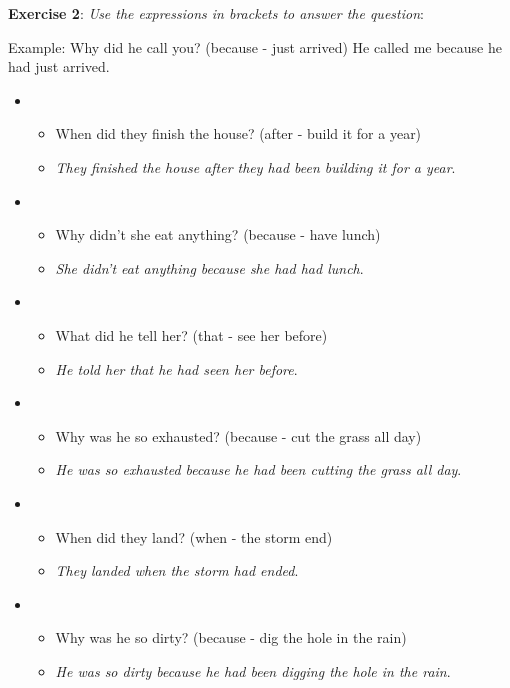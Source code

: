 \textbf{Exercise 2}: \textit{Use the expressions in brackets to answer the question}:

Example:
Why did he call you? (because - just arrived)
He called me because he had just arrived.

\begin{itemize}

\item
\begin{itemize}
\item When did they finish the house? (after - build it for a year)
\item \textit{They finished the house after they had been building it for a year}.
\end{itemize}

\item
\begin{itemize}
\item Why didn't she eat anything? (because - have lunch)
\item \textit{She didn't eat anything because she had had lunch}.
\end{itemize}

\item
\begin{itemize}
\item What did he tell her? (that - see her before)
\item \textit{He told her that he had seen her before}.
\end{itemize}

\item
\begin{itemize}
\item Why was he so exhausted? (because - cut the grass all day)
\item \textit{He was so exhausted because he had been cutting the grass all day}.
\end{itemize}

\item
\begin{itemize}
\item When did they land? (when - the storm end)
\item \textit{They landed when the storm had ended}.
\end{itemize}

\item
\begin{itemize}
\item Why was he so dirty? (because - dig the hole in the rain)
\item \textit{He was so dirty because he had been digging the hole in the rain}.
\end{itemize}


\end{itemize}
